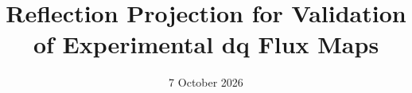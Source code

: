 \title{Reflection Projection for Validation of Experimental dq Flux Maps}
\author{}
\date{7 October 2026}
\newcommand{\PaperAbstract}{Which parts of a measured dq flux map can reflection symmetry identify and remove? Even/odd decomposition defines complementary residual channels and a unique closest symmetric pair under equal weighting. This is a projection in a declared model class, not identification of a physical fault. A portable PSM operating-point dataset is evaluated at measured current coordinates using support-limited mirror interpolation. The removed flux and the raw map remain separate outputs. Interpolation, state mismatch and genuine machine asymmetry limit physical interpretation; a constructed zero residual provides no independent calibration evidence.}
\newif\ifshowglossary\showglossarytrue
\newif\ifshowbibliography\showbibliographytrue
